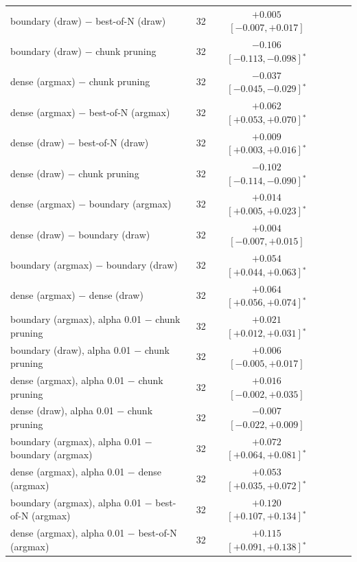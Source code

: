 \begin{tabular}{llcccc}
boundary (draw) $-$ best-of-N (draw) & 32 & $+0.005$ $[-0.007, +0.017]$ & & & \\
boundary (draw) $-$ chunk pruning & 32 & $-0.106$ $[-0.113, -0.098]$$^*$ & & & \\
dense (argmax) $-$ chunk pruning & 32 & $-0.037$ $[-0.045, -0.029]$$^*$ & & & \\
dense (argmax) $-$ best-of-N (argmax) & 32 & $+0.062$ $[+0.053, +0.070]$$^*$ & & & \\
dense (draw) $-$ best-of-N (draw) & 32 & $+0.009$ $[+0.003, +0.016]$$^*$ & & & \\
dense (draw) $-$ chunk pruning & 32 & $-0.102$ $[-0.114, -0.090]$$^*$ & & & \\
dense (argmax) $-$ boundary (argmax) & 32 & $+0.014$ $[+0.005, +0.023]$$^*$ & & & \\
dense (draw) $-$ boundary (draw) & 32 & $+0.004$ $[-0.007, +0.015]$ & & & \\
boundary (argmax) $-$ boundary (draw) & 32 & $+0.054$ $[+0.044, +0.063]$$^*$ & & & \\
dense (argmax) $-$ dense (draw) & 32 & $+0.064$ $[+0.056, +0.074]$$^*$ & & & \\
boundary (argmax), alpha 0.01 $-$ chunk pruning & 32 & $+0.021$ $[+0.012, +0.031]$$^*$ & & & \\
boundary (draw), alpha 0.01 $-$ chunk pruning & 32 & $+0.006$ $[-0.005, +0.017]$ & & & \\
dense (argmax), alpha 0.01 $-$ chunk pruning & 32 & $+0.016$ $[-0.002, +0.035]$ & & & \\
dense (draw), alpha 0.01 $-$ chunk pruning & 32 & $-0.007$ $[-0.022, +0.009]$ & & & \\
boundary (argmax), alpha 0.01 $-$ boundary (argmax) & 32 & $+0.072$ $[+0.064, +0.081]$$^*$ & & & \\
dense (argmax), alpha 0.01 $-$ dense (argmax) & 32 & $+0.053$ $[+0.035, +0.072]$$^*$ & & & \\
boundary (argmax), alpha 0.01 $-$ best-of-N (argmax) & 32 & $+0.120$ $[+0.107, +0.134]$$^*$ & & & \\
dense (argmax), alpha 0.01 $-$ best-of-N (argmax) & 32 & $+0.115$ $[+0.091, +0.138]$$^*$ & & & \\
\bottomrule
\end{tabular}

